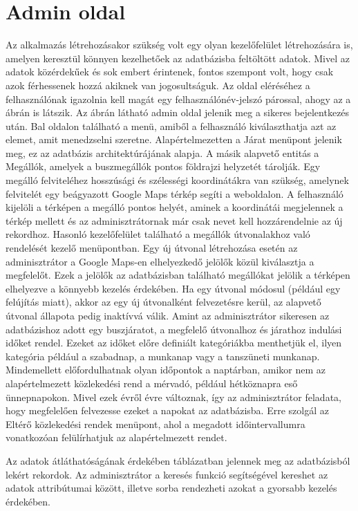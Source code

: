 \section{Admin oldal}
\label{admin}
Az alkalmazás létrehozásakor szükség volt egy olyan kezelőfelület létrehozására is, amelyen keresztül könnyen kezelhetőek az adatbázisba feltöltött adatok.
Mivel az adatok közérdekűek és sok embert érintenek, fontos szempont volt, hogy csak azok férhessenek hozzá akiknek van jogosultságuk.
Az oldal eléréséhez a felhasználónak igazolnia kell magát egy felhasználónév-jelszó párossal, ahogy az a  ábrán is látszik.
Az  ábrán látható admin oldal jelenik meg a sikeres bejelentkezés után.
Bal oldalon található a menü, amiből a felhasználó kiválaszthatja azt az elemet, amit menedzselni szeretne.
Alapértelmezetten a Járat menüpont jelenik meg, ez az adatbázis architektúrájának alapja.
A másik alapvető entitás a Megállók, amelyek a buszmegállók pontos földrajzi helyzetét tárolják.
Egy megálló felviteléhez hosszúsági és szélességi koordinátákra van szükség, amelynek felvitelét egy beágyazott Google Maps térkép segíti a weboldalon.
A felhasználó kijelöli a térképen a megálló pontos helyét, aminek a koordinátái megjelennek a térkép mellett és az adminisztrátornak már csak nevet kell hozzárendelnie az új rekordhoz.
Hasonló kezelőfelület található a megállók útvonalakhoz való rendelését kezelő menüpontban.
Egy új útvonal létrehozása esetén az adminisztrátor a Google Maps-en elhelyezkedő jelölők közül kiválasztja a megfelelőt.
Ezek a jelölők az adatbázisban található megállókat jelölik a térképen elhelyezve a könnyebb kezelés érdekében.
Ha egy útvonal módosul (például egy felújítás miatt), akkor az egy új útvonalként felvezetésre kerül, az alapvető útvonal állapota pedig inaktívvá válik.
Amint az adminisztrátor sikeresen az adatbázishoz adott egy buszjáratot, a megfelelő útvonalhoz és járathoz indulási időket rendel.
Ezeket az időket előre definiált kategóriákba menthetjük el, ilyen kategória például a szabadnap, a munkanap vagy a tanszüneti munkanap.
Mindemellett előfordulhatnak olyan időpontok a naptárban, amikor nem az alapértelmezett közlekedési rend a mérvadó, például hétköznapra eső ünnepnapokon.
Mivel ezek évről évre változnak, így az adminisztrátor feladata, hogy megfelelően felvezesse ezeket a napokat az adatbázisba.
Erre szolgál az Eltérő közlekedési rendek menüpont, ahol a megadott időintervallumra vonatkozóan felülírhatjuk az alapértelmezett rendet.

Az adatok átláthatóságának érdekében táblázatban jelennek meg az adatbázisból lekért rekordok.
Az adminisztrátor a keresés funkció segítségével kereshet az adatok attribútumai között, illetve sorba rendezheti azokat a gyorsabb kezelés érdekében.




















